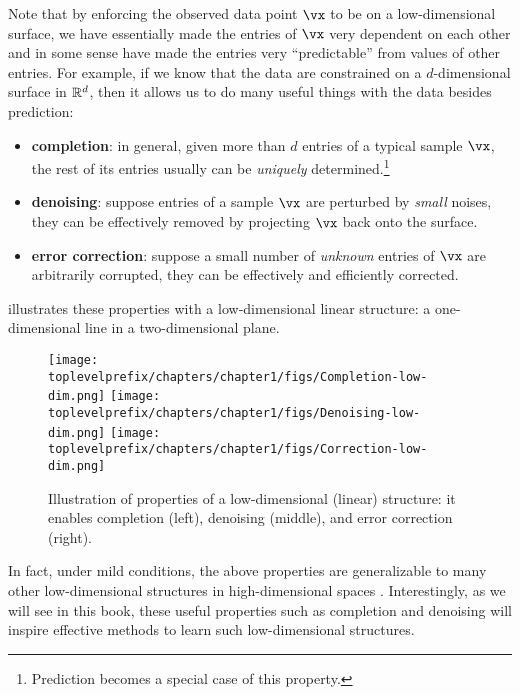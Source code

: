 \documentclass[../../book-main.tex]{subfiles}
\begin{document}
Note that by enforcing the observed data point $\vx$ to be on a low-dimensional surface, we have essentially made the entries of $\vx$ very dependent on each other and in some sense have made the entries very ``predictable'' from values of other entries. For example, if we know that the data are constrained on a $d$-dimensional surface in $\mathbb{R}^d$, then it allows us to do many useful things with the data besides prediction: %
\begin{itemize}
    \item \textbf{completion}: in general, given more than $d$ entries of a typical sample $\vx$, the rest of its entries usually can be {\em uniquely} determined.\footnote{Prediction becomes a special case of this property.} 
    \item \textbf{denoising}: suppose entries of a sample $\vx$ are perturbed by {\em small} noises, they can be effectively removed by projecting $\vx$ back onto the surface.
    \item \textbf{error correction}: suppose a small number of {\em unknown} entries of $\vx$ are arbitrarily corrupted, they can be effectively and efficiently corrected. 
\end{itemize}
 illustrates these properties with a low-dimensional linear structure: a one-dimensional line in a two-dimensional plane. 

\begin{figure}
    \centering
    \texttt{[image: \\toplevelprefix/chapters/chapter1/figs/Completion-low-dim.png]}     \texttt{[image: \\toplevelprefix/chapters/chapter1/figs/Denoising-low-dim.png]} \texttt{[image: \\toplevelprefix/chapters/chapter1/figs/Correction-low-dim.png]} 
    \caption{Illustration of properties of a low-dimensional (linear) structure: it enables completion (left), denoising (middle), and error correction (right).}
    \label{fig:low-dim-properties}
\end{figure}

In fact, under mild conditions, the above properties are generalizable to many other low-dimensional structures in high-dimensional spaces \cite{Wright-Ma-2022}. Interestingly, as we will see in this book, these useful properties such as completion and denoising will inspire effective methods to learn such low-dimensional structures. 
\end{document}
